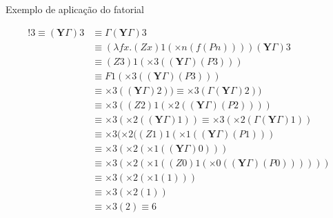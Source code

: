 \begin{frame}[fragile]{Exemplo de aplicação do fatorial}

    \begin{align*}
        !3 \equiv (\mathbf{Y}\Gamma )3 &\equiv \Gamma (\mathbf{Y}\Gamma )3 \\
        &\equiv (\lambda fx.(Zx)1(\times n(f(Pn))))(\mathbf{Y}\Gamma )3 \\
        &\equiv (Z3)1(\times 3((\mathbf{Y}\Gamma )(P3))) \\
        &\equiv F1(\times 3((\mathbf{Y}\Gamma )(P3))) \\
        &\equiv \times 3((\mathbf{Y}\Gamma )2)) \equiv \times 3(\Gamma (\mathbf{Y}\Gamma )2)) \\
        &\equiv \times 3((Z2)1(\times 2((\mathbf{Y}\Gamma )(P2)))) \\
        &\equiv \times 3(\times 2((\mathbf{Y}\Gamma )1)) \equiv \times 3(\times 2(\Gamma (\mathbf{Y}\Gamma )1)) \\
        &\equiv \times 3(\times 2((Z1)1(\times 1((\mathbf{Y}\Gamma )(P1))) \\
        &\equiv \times 3(\times 2(\times 1((\mathbf{Y}\Gamma )0))) \\
        &\equiv \times 3(\times 2(\times 1((Z0)1(\times 0((\mathbf{Y}\Gamma )(P0)))))) \\
        &\equiv \times 3(\times 2(\times 1(1))) \\
        &\equiv \times 3(\times 2(1)) \\
        &\equiv \times 3(2) \equiv 6
    \end{align*}

\end{frame}
